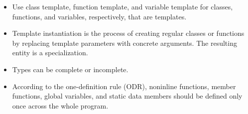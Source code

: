 
\begin{itemize}
\item 
Use class template, function template, and variable template for classes, functions, and variables, respectively, that are templates.

\item 
Template instantiation is the process of creating regular classes or functions by replacing template parameters with concrete arguments. The resulting entity is a specialization.

\item 
Types can be complete or incomplete.

\item 
According to the one-definition rule (ODR), noninline functions, member functions, global variables, and static data members should be defined only once across the whole program.
\end{itemize}